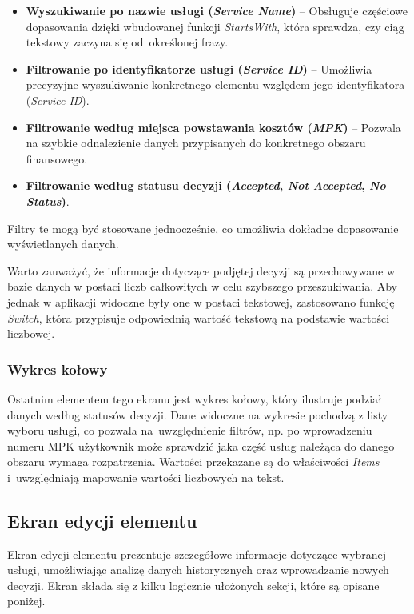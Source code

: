 \begin{itemize}
    \item \textbf{Wyszukiwanie po nazwie usługi (\emph{Service Name})} -- Obsługuje częściowe dopasowania dzięki wbudowanej funkcji \emph{StartsWith}, która sprawdza, czy ciąg tekstowy zaczyna się od~określonej frazy.
    \item \textbf{Filtrowanie po identyfikatorze usługi (\emph{Service ID})} -- Umożliwia precyzyjne wyszukiwanie konkretnego elementu względem jego identyfikatora (\emph{Service ID}).
    \item \textbf{Filtrowanie według miejsca powstawania kosztów (\emph{MPK})} -- Pozwala na szybkie odnalezienie danych przypisanych do konkretnego obszaru finansowego.
    \item \textbf{Filtrowanie według statusu decyzji (\emph{Accepted}, \emph{Not Accepted}, \emph{No Status})}.
\end{itemize}

Filtry te mogą być stosowane jednocześnie, co umożliwia dokładne dopasowanie wyświetlanych danych.

Warto zauważyć, że informacje dotyczące podjętej decyzji są przechowywane w bazie danych w postaci liczb całkowitych w celu szybszego przeszukiwania. Aby jednak w aplikacji widoczne były one w postaci tekstowej, zastosowano funkcję \emph{Switch}, która przypisuje odpowiednią wartość tekstową na podstawie wartości liczbowej.

\subsubsection*{Wykres kołowy}
\par
Ostatnim elementem tego ekranu jest wykres kołowy, który ilustruje podział danych według statusów decyzji.
Dane widoczne na wykresie pochodzą z listy wyboru usługi, co pozwala na~uwzględnienie filtrów, np. po wprowadzeniu numeru MPK użytkownik może sprawdzić jaka część usług należąca do danego obszaru wymaga rozpatrzenia. Wartości przekazane są do właściwości \emph{Items} i~uwzględniają mapowanie wartości liczbowych na tekst.



\subsection{Ekran edycji elementu}

Ekran edycji elementu prezentuje szczegółowe informacje dotyczące wybranej usługi, umożliwiając analizę danych historycznych oraz wprowadzanie nowych decyzji. Ekran składa się z kilku logicznie ułożonych sekcji, które są opisane poniżej.


